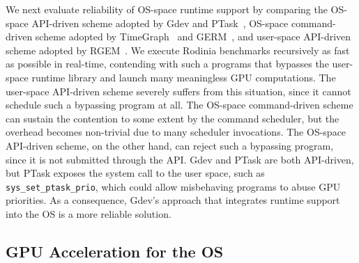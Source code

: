 We next evaluate reliability of OS-space runtime support by comparing
the OS-space API-driven scheme adopted by Gdev and
PTask~\cite{Rossbach_SOSP11}, OS-space command-driven scheme adopted by
TimeGraph~\cite{Kato_ATC11} and GERM~\cite{Bautin_MCNC08}, and
user-space API-driven scheme adopted by RGEM~\cite{Kato_RTSS11}.
We execute Rodinia benchmarks recursively as fast as possible in
real-time, contending with such a programs that bypasses the user-space
runtime library and launch many meaningless GPU computations.
The user-space API-driven scheme severely suffers from this
situation, since it cannot schedule such a bypassing program at all.
The OS-space command-driven scheme can sustain the contention to some
extent by the command scheduler, but the overhead becomes non-trivial
due to many scheduler invocations.
The OS-space API-driven scheme, on the other hand, can reject such a
bypassing program, since it is not submitted through the API.
Gdev and PTask are both API-driven, but PTask exposes the system call to
the user space, such as \texttt{sys\_set\_ptask\_prio}, 
which could allow misbehaving programs to abuse GPU priorities.
As a consequence, Gdev's approach that integrates runtime support into
the OS is a more reliable solution.

\vspace{-0.25em}
\subsection{GPU Acceleration for the OS}
\vspace{-0.25em}

